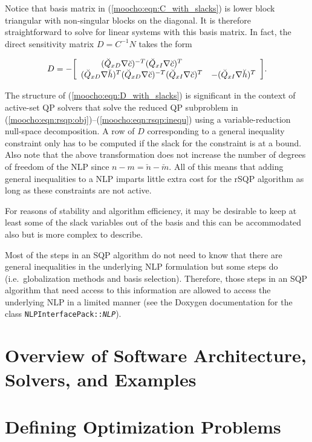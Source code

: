\documentclass[pdf,ps2pdf,11pt]{SANDreport}
\begin{document}
{Notice that basis matrix in (\ref{moocho:eqn:C_with_slacks}) is lower block
triangular with non-singular blocks on the diagonal.  It is therefore straightforward to solve
for linear systems with this basis matrix.  In fact, the direct sensitivity matrix
$D = C^{-1} N$ takes the form

\begin{equation}
D = - {\bmat{cc}
	( \breve{Q}_{xD} \nabla \breve{c} )^{-T} ( \breve{Q}_{xI} \nabla \breve{c} )^{T} \\
    ( \breve{Q}_{xD} \nabla \breve{h} )^T ( \breve{Q}_{xD} \nabla \breve{c} )^{-T} ( \breve{Q}_{xI} \nabla \breve{c} )^{T}
      & -( \breve{Q}_{xI} \nabla \breve{h} )^T
\emat}.
\label{moocho:eqn:D_with_slacks}
\end{equation}

The structure of (\ref{moocho:eqn:D_with_slacks}) is significant in
the context of active-set QP solvers that solve the reduced QP
subproblem in
(\ref{moocho:eqn:rsqp:obj})--(\ref{moocho:eqn:rsqp:inequ}) using a
variable-reduction null-space decomposition.  A row of $D$
corresponding to a general inequality constraint only has to be
computed if the slack for the constraint is at a bound.  Also note
that the above transformation does not increase the number of degrees
of freedom of the NLP since $n-m = \breve{n}-\breve{m}$.  All of this
means that adding general inequalities to a NLP imparts little extra
cost for the rSQP algorithm as long as these constraints are not
active.

For reasons of stability and algorithm efficiency, it may be desirable
to keep at least some of the slack variables out of the basis and this
can be accommodated also but is more complex to describe.

Most of the steps in an SQP algorithm do not need to know that there
are general inequalities in the underlying NLP formulation but some
steps do (i.e.~globalization methods and basis selection).  Therefore,
those steps in an SQP algorithm that need access to this information
are allowed to access the underlying NLP in a limited manner (see the
Doxygen documentation for the class
\texttt{NLP\-Interface\-Pack\-::\textit{NLP}}).

%
\section{Overview of Software Architecture, Solvers, and Examples}
%

%
\section{Defining Optimization Problems}
%

}
\end{document}
